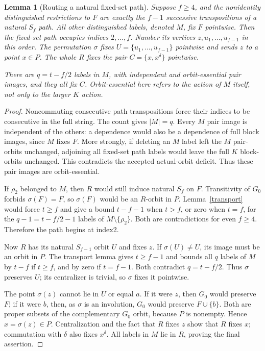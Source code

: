 \documentclass[10pt,a4paper]{article}
\newtheorem{lemma}{Lemma}
\begin{document}
\begin{lemma}[Routing a natural fixed-set path]\label{route}
Suppose $f\geq4$, and the nonidentity distinguished restrictions to
$F$ are exactly the $f-1$ successive transpositions of a natural
$S_f$ path. All other distinguished labels, denoted $M$, fix $F$
pointwise. Then the fixed-set path occupies indices $2,\ldots,f$.
Number its vertices $z,u_1,\ldots,u_{f-1}$ in this order.
The permutation $\sigma$ fixes $U=\{u_1,\ldots,u_{f-1}\}$ pointwise
and sends $z$ to a point $x\in P$. The whole $R$ fixes the pair
$C=\{x,x^\delta\}$ pointwise.

There are $q=t-f/2$ labels in $M$, with independent and orbit-essential
pair images, and they all fix $C$. Orbit-essential here refers to
the action of $M$ itself, not only to the larger $K$ action.
\end{lemma}
\begin{proof}
Noncommuting consecutive path transpositions force their indices to
be consecutive in the full string. The count gives $|M|=q$.
Every $M$ pair image is independent of the others: a dependence
would also be a dependence of full block images, since $M$ fixes $F$.
More strongly, if deleting an $M$ label left the $M$ pair-orbits
unchanged, adjoining all fixed-set path labels would leave the full
$K$ block-orbits unchanged. This contradicts the accepted actual-orbit
deficit. Thus these pair images are orbit-essential.

If $\rho_2$ belonged to $M$, then $R$ would still induce natural
$S_f$ on $F$. Transitivity of $G_0$ forbids $\sigma(F)=F$, so
$\sigma(F)$ would be an $R$-orbit in $P$. Lemma~\ref{transport}
would force $t\geq f$ and give a bound $t-f-1$ when $t>f$,
or zero when $t=f$, for the $q-1=t-f/2-1$ labels of
$M\setminus\{\rho_2\}$. Both are contradictions for even $f\geq4$.
Therefore the path begins at index2.

Now $R$ has its natural $S_{f-1}$ orbit $U$ and fixes $z$.
If $\sigma(U)\ne U$, its image must be an orbit in $P$.
The transport lemma gives $t\geq f-1$ and bounds all $q$ labels
of $M$ by $t-f$ if $t\geq f$, and by zero if $t=f-1$.
Both contradict $q=t-f/2$. Thus $\sigma$ preserves $U$;
its centralizer is trivial, so $\sigma$ fixes it pointwise.

The point $\sigma(z)$ cannot lie in $U$ or equal $a$.
If it were $z$, then $G_0$ would preserve $F$; if it were $b$,
then, as $\sigma$ is an involution, $G_0$ would preserve
$F\cup\{b\}$. Both are proper subsets of the complementary
$G_0$ orbit, because $P$ is nonempty. Hence $x=\sigma(z)\in P$.
Centralization and the fact that $R$ fixes $z$ show that $R$ fixes
$x$; commutation with $\delta$ also fixes $x^\delta$.
All labels in $M$ lie in $R$, proving the final assertion.
\end{proof}
\end{document}
